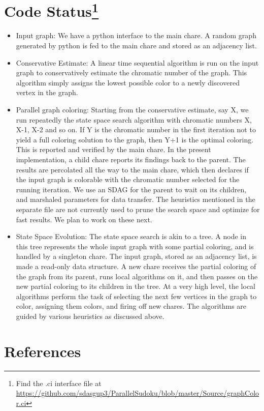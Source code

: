 \documentclass[10pt,twoside]{article}
\begin{document}
\section[Code Status]{Code Status\footnote{Find the .ci interface file at \url{https://github.com/sdasgup3/ParallelSudoku/blob/master/Source/graphColor.ci} }}
\begin{itemize}

  \item Input graph: We have a python interface to the main chare. A random
    graph generated by python is fed to the main chare and stored as an
    adjacency list.  
    
  \item Conservative Estimate: A linear time sequential algorithm
    is run on the input graph to conservatively estimate the chromatic number
    of the graph. This algorithm simply assigns the lowest possible color to a
    newly discovered vertex in the graph.  
    
  \item Parallel graph coloring:  Starting from the conservative estimate, say
  X, we run repeatedly the state space search algorithm with chromatic numbers
  X, X-1, X-2 and so on. If Y is the chromatic number in the first iteration
  not to yield a full coloring solution to the graph, then Y+1 is the optimal
  coloring. This is reported and verified by the main chare.  In the present
  implementation, a child chare reports its findings back to the parent. The
  results are percolated all the way to the main chare, which then declares if
  the input graph is colorable with the chromatic number selected for the
  running iteration. We use an SDAG for the parent to wait on its children, and
  marshaled parameters for data transfer. The heuristics mentioned in the
  separate file are not currently used to prune the search space and optimize
  for fast results. We plan to work on these next.  
    
  \item  State Space Evolution: The state space search is akin to a tree. A
    node in this tree represents the whole input graph with some partial
    coloring, and is handled by a singleton chare. The input graph, stored as
    an adjacency list, is made a read-only data structure. A new chare receives
    the partial coloring of the graph from its parent, runs local algorithms on
    it, and then passes on the new partial coloring to its children in the
    tree. At a very high level, the local algorithms perform the task of
    selecting the next few vertices in the graph to color, assigning them
    colors, and firing off new chares. The algorithms are guided by various
    heuristics as discussed above.

\end{itemize}

\section{References}

\nocite{*}

\end{document}

